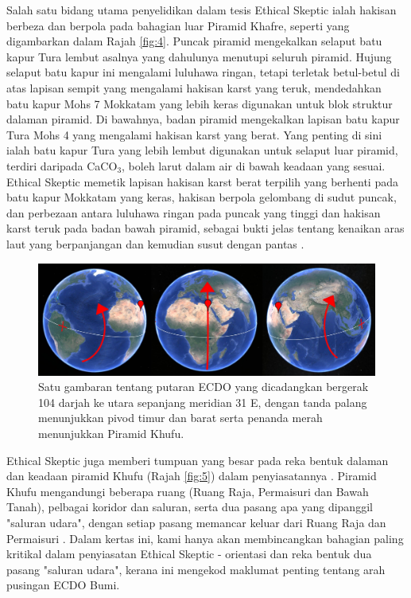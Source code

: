 \documentclass[10pt,twocolumn,letterpaper]{article}
\begin{document}
Salah satu bidang utama penyelidikan dalam tesis Ethical Skeptic ialah hakisan berbeza dan berpola pada bahagian luar Piramid Khafre, seperti yang digambarkan dalam Rajah \ref{fig:4}. Puncak piramid mengekalkan selaput batu kapur Tura lembut asalnya yang dahulunya menutupi seluruh piramid. Hujung selaput batu kapur ini mengalami luluhawa ringan, tetapi terletak betul-betul di atas lapisan sempit yang mengalami hakisan karst yang teruk, mendedahkan batu kapur Mohs 7 Mokkatam yang lebih keras digunakan untuk blok struktur dalaman piramid. Di bawahnya, badan piramid mengekalkan lapisan batu kapur Tura Mohs 4 yang mengalami hakisan karst yang berat. Yang penting di sini ialah batu kapur Tura yang lebih lembut digunakan untuk selaput luar piramid, terdiri daripada CaCO$_3$, boleh larut dalam air di bawah keadaan yang sesuai. Ethical Skeptic memetik lapisan hakisan karst berat terpilih yang berhenti pada batu kapur Mokkatam yang keras, hakisan berpola gelombang di sudut puncak, dan perbezaan antara luluhawa ringan pada puncak yang tinggi dan hakisan karst teruk pada badan bawah piramid, sebagai bukti jelas tentang kenaikan aras laut yang berpanjangan dan kemudian susut dengan pantas \cite{27}.

\begin{figure}[b]
\begin{center}
\includegraphics[width=1\textwidth]{drawing.jpg}
\end{center}
   \caption{Satu gambaran tentang putaran ECDO yang dicadangkan bergerak 104 darjah ke utara sepanjang meridian 31 E, dengan tanda palang menunjukkan pivod timur dan barat serta penanda merah menunjukkan Piramid Khufu.}
\label{fig:6}
\end{figure}
Ethical Skeptic juga memberi tumpuan yang besar pada reka bentuk dalaman dan keadaan piramid Khufu (Rajah \ref{fig:5}) dalam penyiasatannya \cite{28}. Piramid Khufu mengandungi beberapa ruang (Ruang Raja, Permaisuri dan Bawah Tanah), pelbagai koridor dan saluran, serta dua pasang apa yang dipanggil "saluran udara", dengan setiap pasang memancar keluar dari Ruang Raja dan Permaisuri \cite{29,30}. Dalam kertas ini, kami hanya akan membincangkan bahagian paling kritikal dalam penyiasatan Ethical Skeptic - orientasi dan reka bentuk dua pasang "saluran udara", kerana ini mengekod maklumat penting tentang arah pusingan ECDO Bumi.
\end{document}
